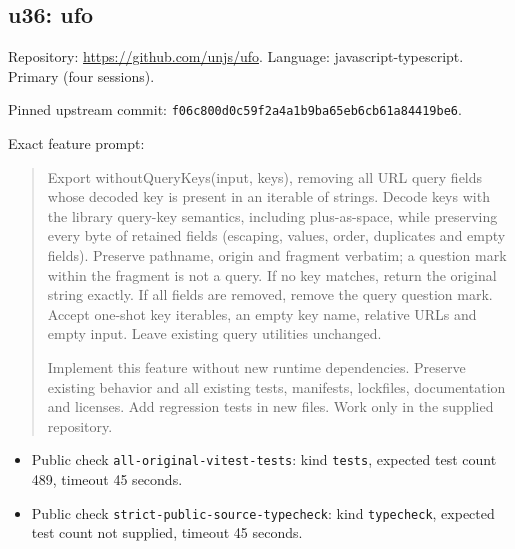 \documentclass[manuscript,screen,nonacm]{acmart}
\providecommand{\tightlist}{\setlength{\itemsep}{0pt}\setlength{\parskip}{0pt}}
\begin{document}
\subsection{u36: ufo}\label{u36-ufo}

Repository: \url{https://github.com/unjs/ufo}. Language:
javascript-typescript. Primary (four sessions).

Pinned upstream commit:
\nolinkurl{f06c800d0c59f2a4a1b9ba65eb6cb61a84419be6}.

Exact feature prompt:

\begin{quote}
Export withoutQueryKeys(input, keys), removing all URL query fields
whose decoded key is present in an iterable of strings. Decode keys with
the library query-key semantics, including plus-as-space, while
preserving every byte of retained fields (escaping, values, order,
duplicates and empty fields). Preserve pathname, origin and fragment
verbatim; a question mark within the fragment is not a query. If no key
matches, return the original string exactly. If all fields are removed,
remove the query question mark. Accept one-shot key iterables, an empty
key name, relative URLs and empty input. Leave existing query utilities
unchanged.

Implement this feature without new runtime dependencies. Preserve
existing behavior and all existing tests, manifests, lockfiles,
documentation and licenses. Add regression tests in new files. Work only
in the supplied repository.
\end{quote}

\begin{itemize}
\tightlist
\item
  Public check \nolinkurl{all-original-vitest-tests}: kind
  \texttt{tests}, expected test count 489, timeout 45 seconds.
\item
  Public check \nolinkurl{strict-public-source-typecheck}: kind
  \texttt{typecheck}, expected test count not supplied, timeout 45
  seconds.
\end{itemize}


\end{document}
